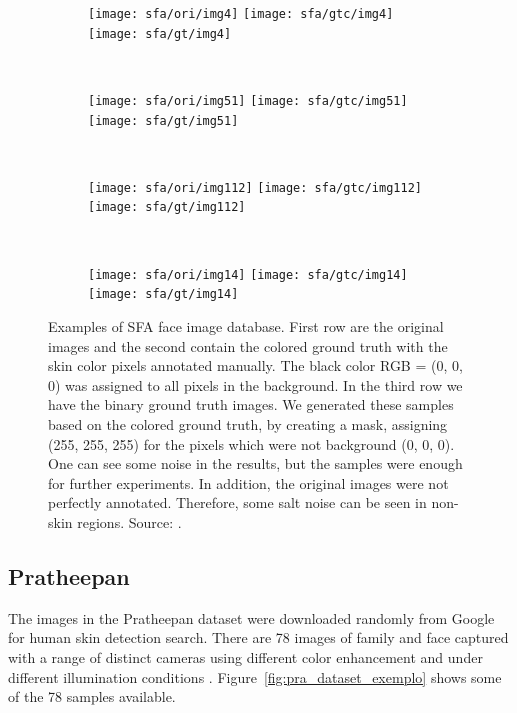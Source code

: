 \begin{figure}[H]
    \centering
    \begin{subfigure}[t]{0.21\textwidth}
        \texttt{[image: sfa/ori/img4]}
        \texttt{[image: sfa/gtc/img4]}
        \texttt{[image: sfa/gt/img4]}
    \end{subfigure}
    ~
    \begin{subfigure}[t]{0.21\textwidth}
        \texttt{[image: sfa/ori/img51]}
        \texttt{[image: sfa/gtc/img51]}
        \texttt{[image: sfa/gt/img51]}
    \end{subfigure}
    ~
    \begin{subfigure}[t]{0.21\textwidth}
        \texttt{[image: sfa/ori/img112]}
        \texttt{[image: sfa/gtc/img112]}
        \texttt{[image: sfa/gt/img112]}
    \end{subfigure}
    ~ %
    \begin{subfigure}[t]{0.21\textwidth}
        \texttt{[image: sfa/ori/img14]}
        \texttt{[image: sfa/gtc/img14]}
        \texttt{[image: sfa/gt/img14]}
    \end{subfigure}
    \caption[Examples of SFA face image database]{Examples of SFA face image database. First row are the original images and the second contain the colored ground truth with the skin color pixels annotated manually. The black color RGB = (0, 0, 0) was assigned to all pixels in the background. In the third row we have the binary ground truth images. We generated these samples based on the colored ground truth, by creating a mask, assigning (255, 255, 255) for the pixels which were not background (0, 0, 0). One can see some noise in the results, but the samples were enough for further experiments. In addition, the original images were not perfectly annotated. Therefore, some salt noise can be seen in non-skin regions. Source: \citet{sfa-skin-dataset:13}.}
    \label{fig:sfa_dataset_exemplo}
\end{figure}



\subsection{Pratheepan}
\label{sec:datasets_pratheepan}
The images in the Pratheepan dataset were downloaded randomly from Google for human skin detection search. There are 78 images of family and face captured with a range of distinct cameras using different color enhancement and under different illumination conditions \cite{tan:12}. Figure~\ref{fig:pra_dataset_exemplo} shows some of the 78 samples available.

